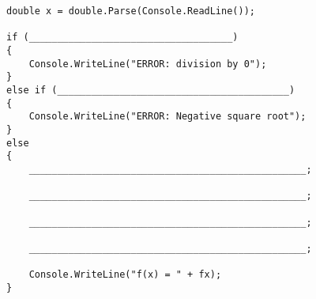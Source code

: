 \documentclass[14pt]{extarticle}
\begin{document}
\begin{boxCode}
\begin{english}
\begin{verbatim}
double x = double.Parse(Console.ReadLine());

if (____________________________________)
{
    Console.WriteLine("ERROR: division by 0");
}
else if (_________________________________________)
{
    Console.WriteLine("ERROR: Negative square root");
}
else
{
    _________________________________________________;

    _________________________________________________;

    _________________________________________________;

    _________________________________________________;

    Console.WriteLine("f(x) = " + fx);
}
\end{verbatim}
\end{english}
\end{boxCode}

\fi
\end{document}
